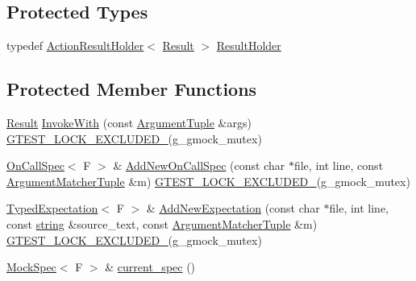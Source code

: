 \subsection*{Protected Types}
\begin{DoxyCompactItemize}
\item 
typedef \hyperlink{classtesting_1_1internal_1_1_action_result_holder}{Action\+Result\+Holder}$<$ \hyperlink{classtesting_1_1internal_1_1_function_mocker_base_aa50abc4055b4d3a14ad64c317bccec8d}{Result} $>$ \hyperlink{classtesting_1_1internal_1_1_function_mocker_base_aa4e1b2ee217676c9e70c3006b19a8074}{Result\+Holder}
\end{DoxyCompactItemize}
\subsection*{Protected Member Functions}
\begin{DoxyCompactItemize}
\item 
\hyperlink{classtesting_1_1internal_1_1_function_mocker_base_aa50abc4055b4d3a14ad64c317bccec8d}{Result} \hyperlink{classtesting_1_1internal_1_1_function_mocker_base_a869ec713f000b4e7829c660efc25e8cd}{Invoke\+With} (const \hyperlink{classtesting_1_1internal_1_1_function_mocker_base_a336432a07e544af4ffb8103603471ca3}{Argument\+Tuple} \&args) \hyperlink{gtest-port_8h_a69abff5a4efdd07bd5faebe3dd318d06}{G\+T\+E\+S\+T\+\_\+\+L\+O\+C\+K\+\_\+\+E\+X\+C\+L\+U\+D\+E\+D\+\_\+}(g\+\_\+gmock\+\_\+mutex)
\item 
\hyperlink{classtesting_1_1internal_1_1_on_call_spec}{On\+Call\+Spec}$<$ F $>$ \& \hyperlink{classtesting_1_1internal_1_1_function_mocker_base_a22ece3b6e8d24f11d8f4ba9c17b737c4}{Add\+New\+On\+Call\+Spec} (const char $\ast$file, int line, const \hyperlink{classtesting_1_1internal_1_1_function_mocker_base_ab790bcb1dcf57fa6659365386723ae5a}{Argument\+Matcher\+Tuple} \&m) \hyperlink{gtest-port_8h_a69abff5a4efdd07bd5faebe3dd318d06}{G\+T\+E\+S\+T\+\_\+\+L\+O\+C\+K\+\_\+\+E\+X\+C\+L\+U\+D\+E\+D\+\_\+}(g\+\_\+gmock\+\_\+mutex)
\item 
\hyperlink{classtesting_1_1internal_1_1_typed_expectation}{Typed\+Expectation}$<$ F $>$ \& \hyperlink{classtesting_1_1internal_1_1_function_mocker_base_aa2c35c565f08d3649436af443ece468f}{Add\+New\+Expectation} (const char $\ast$file, int line, const \hyperlink{namespacetesting_1_1internal_a8e8ff5b11e64078831112677156cb111}{string} \&source\+\_\+text, const \hyperlink{classtesting_1_1internal_1_1_function_mocker_base_ab790bcb1dcf57fa6659365386723ae5a}{Argument\+Matcher\+Tuple} \&m) \hyperlink{gtest-port_8h_a69abff5a4efdd07bd5faebe3dd318d06}{G\+T\+E\+S\+T\+\_\+\+L\+O\+C\+K\+\_\+\+E\+X\+C\+L\+U\+D\+E\+D\+\_\+}(g\+\_\+gmock\+\_\+mutex)
\item 
\hyperlink{classtesting_1_1internal_1_1_mock_spec}{Mock\+Spec}$<$ F $>$ \& \hyperlink{classtesting_1_1internal_1_1_function_mocker_base_a744318106e20b346f4f1efbf5a601644}{current\+\_\+spec} ()
\end{DoxyCompactItemize}
